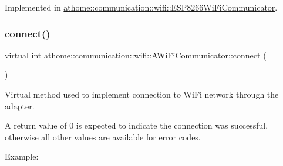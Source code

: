 Implemented in \mbox{\hyperlink{classathome_1_1communication_1_1wifi_1_1_e_s_p8266_wi_fi_communicator_af9b1e28910959893748763faaa5373a0}{athome\+::communication\+::wifi\+::\+E\+S\+P8266\+Wi\+Fi\+Communicator}}.

\mbox{\label{classathome_1_1communication_1_1wifi_1_1_a_wi_fi_communicator_a309927109fbc19aa0fb2afb71d50bbf9}} 
\subsubsection{\texorpdfstring{connect()}{connect()}}
{\footnotesize\ttfamily virtual int athome\+::communication\+::wifi\+::\+A\+Wi\+Fi\+Communicator\+::connect (\begin{DoxyParamCaption}{ }\end{DoxyParamCaption})\hspace{0.3cm}{\ttfamily [pure virtual]}}

Virtual method used to implement connection to Wi\+Fi network through the adapter.

A return value of 0 is expected to indicate the connection was successful, otherwise all other values are available for error codes.

Example\+:


